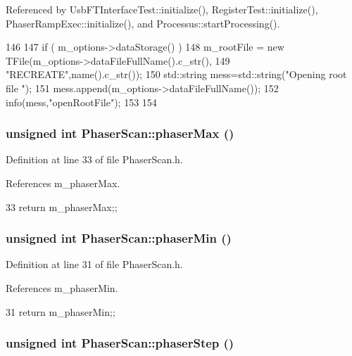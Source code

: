 Referenced by UsbFTInterfaceTest::initialize(), RegisterTest::initialize(), PhaserRampExec::initialize(), and Processus::startProcessing().


\begin{DoxyCode}
146                                {
147   if ( m_options->dataStorage() ){
148     m_rootFile = new TFile(m_options->dataFileFullName().c_str(),
149                            "RECREATE",name().c_str());
150         std::string mess=std::string("Opening root file ");
151         mess.append(m_options->dataFileFullName());
152         info(mess,"openRootFile");
153   }
154 }
\end{DoxyCode}
\hypertarget{classPhaserScan_a2cccb1c5b687c5cdf934dd3eb11a73ad}{
\subsubsection[{phaserMax}]{\setlength{\rightskip}{0pt plus 5cm}unsigned int PhaserScan::phaserMax ()}}
\label{classPhaserScan_a2cccb1c5b687c5cdf934dd3eb11a73ad}


Definition at line 33 of file PhaserScan.h.

References m\_\-phaserMax.


\begin{DoxyCode}
33 {return m_phaserMax;};
\end{DoxyCode}
\hypertarget{classPhaserScan_ab24e5fc6e36639ce31faf430ca87afc9}{
\subsubsection[{phaserMin}]{\setlength{\rightskip}{0pt plus 5cm}unsigned int PhaserScan::phaserMin ()}}
\label{classPhaserScan_ab24e5fc6e36639ce31faf430ca87afc9}


Definition at line 31 of file PhaserScan.h.

References m\_\-phaserMin.


\begin{DoxyCode}
31 {return m_phaserMin;};
\end{DoxyCode}
\hypertarget{classPhaserScan_a8bebde600274e342a78783e49917b64d}{
\subsubsection[{phaserStep}]{\setlength{\rightskip}{0pt plus 5cm}unsigned int PhaserScan::phaserStep ()}}
\label{classPhaserScan_a8bebde600274e342a78783e49917b64d}



